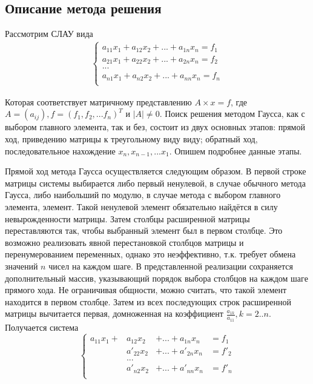 \documentclass[a4paper,12pt,titlepage,finall]{article}
\begin{document}
\subsection{Описание метода решения}
Рассмотрим СЛАУ вида
\begin{align*}
\begin{cases}
a_{11} x_1 + a_{12} x_2 + ... + a_{1n} x_n = f_1\\
a_{21} x_1 + a_{22} x_2 + ... + a_{2n} x_n = f_2\\
...\\
a_{n1} x_1 + a_{n2} x_2 + ... + a_{nn} x_n = f_n\\
\end{cases}
\end{align*}
\par
Которая соответствует матричному представлению $A \times x = f$, где $A = (a_{ij}), f = (f_1, f_2, ... f_n)^T$ и $|A| \neq 0$. Поиск решения методом Гаусса, как с выбором главного элемента, так и без, состоит из двух основных этапов: прямой ход, приведению матрицы к треугольному виду виду; обратный ход, последовательное нахождение $x_n, x_{n - 1}, ... x_1$. Опишем подробнее данные этапы.
\par
Прямой ход метода Гаусса осуществляется следующим образом. В первой строке матрицы системы выбирается либо первый ненулевой, в случае обычного метода Гаусса, либо наибольший по модулю, в случае метода с выбором главного элемента, элемент. Такой ненулевой элемент обязательно найдётся в силу невырожденности матрицы. Затем столбцы расширенной матрицы переставляются так, чтобы выбранный элемент был в первом столбце. Это возможно реализовать явной перестановкой столбцов матрицы и перенумерованием переменных, однако это неэффективно, т.к. требует обмена значений $n$ чисел на каждом шаге. В представленной реализации сохраняется дополнительный массив, указывающий порядок выбора столбцов на каждом шаге прямого хода. Не ограничивая общности, можно считать, что такой элемент находится в первом столбце. Затем из всех последующих строк расширенной матрицы вычитается первая, домноженная на коэффициент $\frac{a_{1k}}{a_{11}}, k = 2 .. n$. Получается система
\begin{equation*}
\left\{
\begin{alignedat}{3}
a_{11} x_1 + &a_{12} x_2 &+ ... + a_{1n} x_n & = f_1\\
           &a'_{22} x_2 &+ ... + a'_{2n} x_n & = f'_2\\
&...&&\\
           &a'_{n2} x_2 &+ ... + a'_{nn} x_n & = f'_n\\
\end{alignedat}
\right.
\end{equation*}
\end{document}
